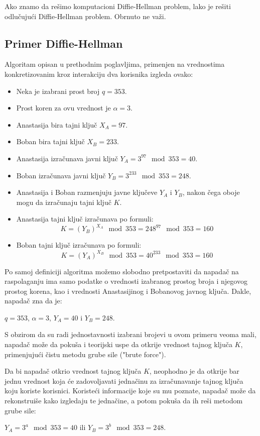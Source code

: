 \documentclass[a4paper]{article}
\begin{document}
Ako znamo da rešimo komputacioni Diffie-Hellman problem, lako je rešiti odlučujući Diffie-Hellman problem.
Obrnuto ne važi. \cite{ddh-vs-cdh}


\subsection{Primer Diffie-Hellman}
\label{sec:primerDH}

Algoritam opisan u prethodnim poglavljima, primenjen na vrednostima konkretizovanim kroz interakciju dva korisnika izgleda ovako:
\begin{itemize}
  \item Neka je izabrani prost broj $q=353$.
  \item Prost koren za ovu vrednost je $\alpha=3$. 
  \item Anastasija bira tajni ključ $X_A=97$. 
  \item Boban bira tajni ključ $X_B=233$.
  \item Anastasija izračunava javni ključ $Y_A=3^{97}\mod353=40$.
  \item Boban izračunava javni ključ $Y_B=3^{233}\mod353=248$.
  \item Anastasija i Boban razmenjuju javne ključeve $Y_A$ i $Y_B$, nakon čega oboje mogu da izračunaju tajni ključ $K$.
  \item Anastasija tajni ključ izračunava po formuli: $$K=(Y_B)^{X_A}\mod353=248^{97}\mod353=160$$
  \item Boban tajni ključ izračunava po formuli: $$K=(Y_A)^{X_B}\mod353=40^{233}\mod353=160$$
\end{itemize}

Po samoj definiciji algoritma možemo slobodno pretpostaviti da napadač na raspolaganju ima samo podatke o vrednosti izabranog prostog broja i njegovog prostog korena, kao i vrednosti Anastasijinog i Bobanovog javnog ključa. Dakle, napadač zna da je: \\\centerline{$q=353$, $\alpha=3$, $Y_A=40$ i $Y_B=248$.}

S obzirom da su radi jednostavnosti izabrani brojevi u ovom primeru veoma mali, napadač može da pokuša i teorijski uspe da otkrije vrednost tajnog ključa $K$, primenjujući čistu metodu grube sile ("brute force").

Da bi napadač otkrio vrednost tajnog ključa $K$, neophodno je da otkrije bar jednu vrednost koja će zadovoljavati jednačinu za izračunavanje tajnog ključa koju koriste korisnici. Koristeći informacije koje su mu poznate, napadač može da rekonstruiše kako izgledaju te jednačine, a potom pokuša da ih reši metodom grube sile: \\\centerline{$Y_A=3^a\mod353=40$ ili $Y_B=3^b\mod353=248$.}
\end{document}
